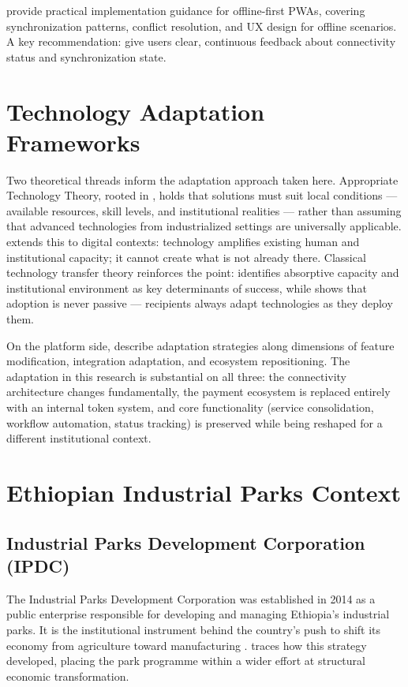 \citet{Cherukuri2024} provide practical implementation guidance for offline-first PWAs, covering synchronization patterns, conflict resolution, and UX design for offline scenarios. A key recommendation: give users clear, continuous feedback about connectivity status and synchronization state.

\section{Technology Adaptation Frameworks}

Two theoretical threads inform the adaptation approach taken here. Appropriate Technology Theory, rooted in \citet{Schumacher1973}, holds that solutions must suit local conditions --- available resources, skill levels, and institutional realities --- rather than assuming that advanced technologies from industrialized settings are universally applicable. \citet{Toyama2015} extends this to digital contexts: technology amplifies existing human and institutional capacity; it cannot create what is not already there. Classical technology transfer theory reinforces the point: \citet{Rogers2003} identifies absorptive capacity and institutional environment as key determinants of success, while \citet{Edgerton2007} shows that adoption is never passive --- recipients always adapt technologies as they deploy them.

On the platform side, \citet{Schreieck2022} describe adaptation strategies along dimensions of feature modification, integration adaptation, and ecosystem repositioning. The adaptation in this research is substantial on all three: the connectivity architecture changes fundamentally, the payment ecosystem is replaced entirely with an internal token system, and core functionality (service consolidation, workflow automation, status tracking) is preserved while being reshaped for a different institutional context.

\section{Ethiopian Industrial Parks Context}

\subsection{Industrial Parks Development Corporation (IPDC)}

The Industrial Parks Development Corporation was established in 2014 as a public enterprise responsible for developing and managing Ethiopia's industrial parks. It is the institutional instrument behind the country's push to shift its economy from agriculture toward manufacturing \citep{Oqubay2018, Guteta2024}. \citet{Gebreeyesus2019} traces how this strategy developed, placing the park programme within a wider effort at structural economic transformation.

